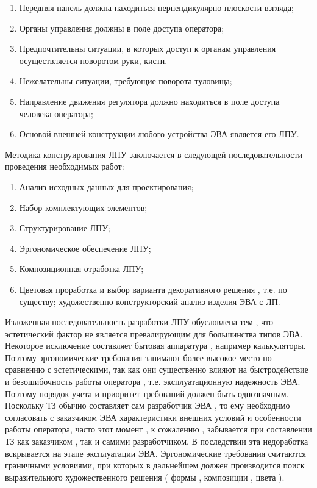 \documentclass[unicode, 12pt, a4paper, oneside]{article}
\begin{document}
\begin{enumerate}
\item Передняя панель должна находиться перпендикулярно плоскости взгляда;
\item Органы управления должны в поле доступа оператора;
\item Предпочтительны ситуации, в которых доступ к органам управления осуществляется поворотом руки, кисти. \item Нежелательны ситуации, требующие поворота туловища;
\item Направление движения регулятора должно находиться в поле доступа человека-оператора;
\item Основой внешней конструкции любого устройства ЭВА является его ЛПУ.
\end{enumerate}

Методика конструирования ЛПУ заключается в следующей последовательности проведения необходимых работ:

\begin{enumerate}
\item Анализ исходных данных для проектирования;
\item Набор комплектующих элементов;
\item Структурирование ЛПУ;
\item Эргономическое обеспечение ЛПУ;
\item Композиционная отработка ЛПУ;
\item Цветовая проработка и выбор варианта декоративного решения , т.е. по существу; художественно-конструкторский анализ изделия ЭВА с ЛП.
\end{enumerate}

Изложенная последовательность разработки ЛПУ обусловлена тем , что эстетический фактор не является превалирующим для большинства типов ЭВА. Некоторое исключение составляет бытовая аппаратура , например калькуляторы. Поэтому эргономические требования занимают более высокое место по сравнению с эстетическими, так как они существенно влияют на быстродействие и безошибочность работы оператора , т.е. эксплуатационную надежность ЭВА. Поэтому порядок учета и приоритет требований должен быть однозначным. Поскольку ТЗ обычно составляет сам разработчик ЭВА , то ему необходимо согласовать с заказчиком ЭВА характеристики внешних условий и особенности работы оператора, часто этот момент , к сожалению , забывается при составлении ТЗ как заказчиком , так и самими разработчиком. В последствии эта недоработка вскрывается на этапе эксплуатации ЭВА.
Эргономические требования считаются граничными условиями, при которых в дальнейшем должен производится поиск выразительного художественного решения ( формы , композиции , цвета ).
\end{document}
